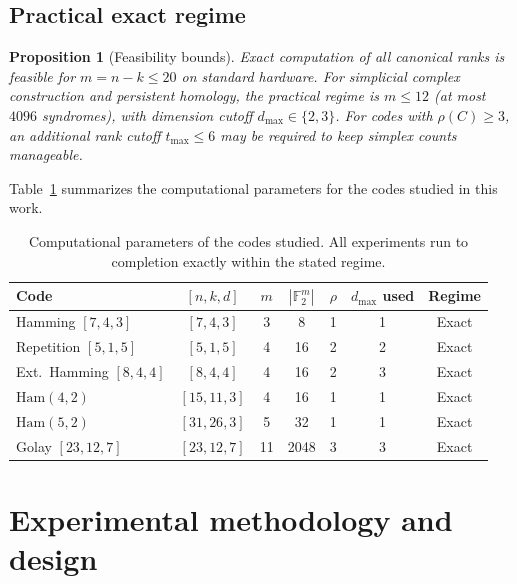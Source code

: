 \documentclass[11pt,twoside,leqno]{article}
\theoremstyle{definition}
\theoremstyle{plain}
\newtheorem{proposition}[definition]{Proposition}
\theoremstyle{remark}
\newcommand{\Ftwo}{\mathbb{F}_2}
\newcommand{\covrad}{\rho}
\begin{document}
\subsection{Practical exact regime}\label{sec:regime}

\begin{proposition}[Feasibility bounds]\label{prop:regime}
Exact computation of all canonical ranks is feasible for $m=n-k\le 20$ on standard hardware.
For simplicial complex construction and persistent homology, the practical regime is $m\le 12$
(at most $4096$ syndromes), with dimension cutoff $d_{\max}\in\{2,3\}$. For codes with
$\covrad(C)\ge 3$, an additional rank cutoff $t_{\max}\le 6$ may be required to keep simplex counts
manageable.
\end{proposition}

Table~\ref{tab:regime} summarizes the computational parameters for the codes studied in this work.

\begin{table}[h]
\centering
\caption{Computational parameters of the codes studied. All experiments run to completion exactly within the stated regime.}\label{tab:regime}
\begin{tabular}{lcccccc}
\toprule
Code & $[n,k,d]$ & $m$ & $|\Ftwo^m|$ & $\covrad$ & $d_{\max}$ used & Regime \\
\midrule
Hamming $[7,4,3]$         & $[7,4,3]$   & 3  & 8    & 1 & 1 & Exact \\
Repetition $[5,1,5]$      & $[5,1,5]$   & 4  & 16   & 2 & 2 & Exact \\
Ext.\ Hamming $[8,4,4]$   & $[8,4,4]$   & 4  & 16   & 2 & 3 & Exact \\
$\mathrm{Ham}(4,2)$        & $[15,11,3]$ & 4  & 16   & 1 & 1 & Exact \\
$\mathrm{Ham}(5,2)$        & $[31,26,3]$ & 5  & 32   & 1 & 1 & Exact \\
Golay $[23,12,7]$         & $[23,12,7]$ & 11 & 2048 & 3 & 3 & Exact \\
\bottomrule
\end{tabular}
\end{table}

\section{Experimental methodology and design}\label{sec:methodology}
\end{document}
